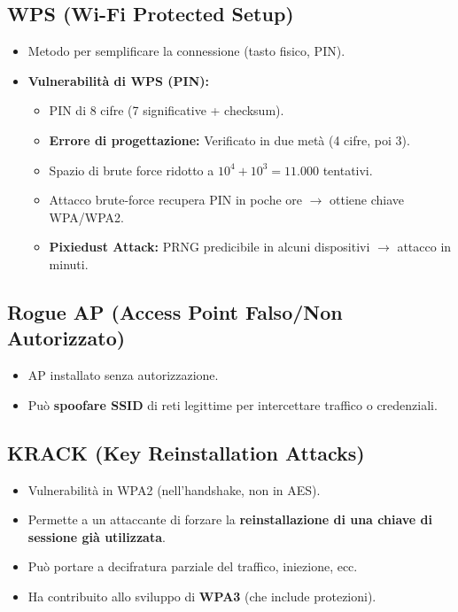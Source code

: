 \subsection{WPS (Wi-Fi Protected Setup)}
\begin{itemize}
    \item Metodo per semplificare la connessione (tasto fisico, PIN).
    \item \textbf{Vulnerabilità di WPS (PIN):}
    \begin{itemize}
        \item PIN di 8 cifre (7 significative + checksum).
        \item \textbf{Errore di progettazione:} Verificato in due metà (4 cifre, poi 3).
        \item Spazio di brute force ridotto a $10^4 + 10^3 = 11.000$ tentativi.
        \item Attacco brute-force recupera PIN in poche ore $\rightarrow$ ottiene chiave WPA/WPA2.
        \item \textbf{Pixiedust Attack:} PRNG predicibile in alcuni dispositivi $\rightarrow$ attacco in minuti.
    \end{itemize}
\end{itemize}

\subsection{Rogue AP (Access Point Falso/Non Autorizzato)}
\begin{itemize}
    \item AP installato senza autorizzazione.
    \item Può \textbf{spoofare SSID} di reti legittime per intercettare traffico o credenziali.
\end{itemize}

\subsection{KRACK (Key Reinstallation Attacks)}
\begin{itemize}
    \item Vulnerabilità in WPA2 (nell'handshake, non in AES).
    \item Permette a un attaccante di forzare la \textbf{reinstallazione di una chiave di sessione già utilizzata}.
    \item Può portare a decifratura parziale del traffico, iniezione, ecc.
    \item Ha contribuito allo sviluppo di \textbf{WPA3} (che include protezioni).
\end{itemize}

